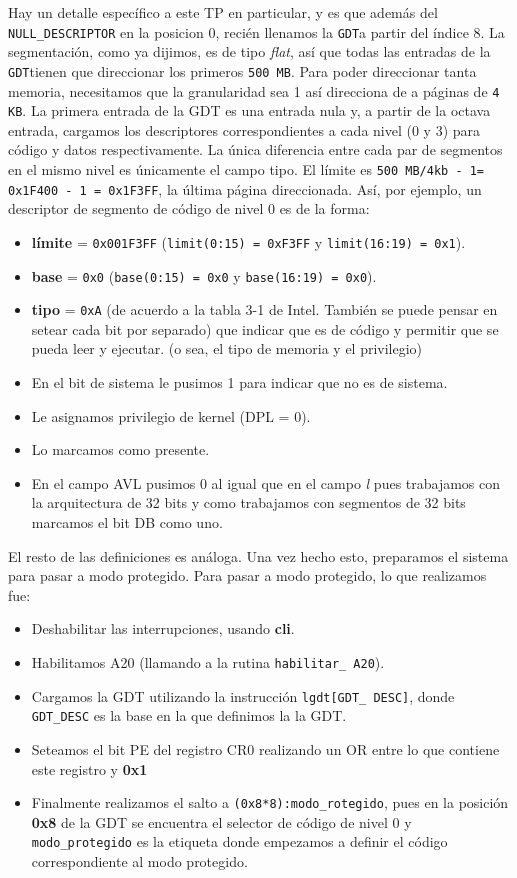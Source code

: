 \documentclass[twocolumn,10pt]{article}
\newcommand{\GDT}{\texttt{GDT}}
\begin{document}
Hay un detalle específico a este TP en particular, y es que además del
\texttt{NULL\_DESCRIPTOR} en la posicion 0, recién llenamos la \GDT a
partir del índice 8. La segmentación, como ya dijimos, es de tipo
\emph{flat}, así que todas las entradas de la \GDT tienen que
direccionar los primeros \texttt{500 MB}. Para poder direccionar tanta
memoria, necesitamos que la granularidad sea 1 así direcciona de a
páginas de \texttt{4 KB}. La primera entrada de la GDT es una entrada
nula y, a partir de la octava entrada, cargamos los descriptores
correspondientes a cada nivel (0 y 3) para código y datos
respectivamente. La única diferencia entre cada par de segmentos en el
mismo nivel es únicamente el campo tipo. El límite es \texttt{500
  MB/4kb - 1= 0x1F400 - 1 = 0x1F3FF}, la última página
direccionada. Así, por ejemplo, un descriptor de segmento de código de
nivel 0 es de la forma:
\begin{itemize}
\item \textbf{límite} = \texttt{0x001F3FF} (\texttt{limit(0:15) =
    0xF3FF} y \texttt{limit(16:19) = 0x1}).
\item \textbf{base} = \texttt{0x0} (\texttt{base(0:15) = 0x0} y
  \texttt{base(16:19) = 0x0}).
\item \textbf{tipo} = \texttt{0xA} (de acuerdo a la tabla 3-1 de
  Intel. También se puede pensar en setear cada bit por separado) que
  indicar que es de código y permitir que se pueda leer y ejecutar. (o
  sea, el tipo de memoria y el privilegio)
\item En el bit de sistema le pusimos 1 para indicar que no es
  de sistema.
\item Le asignamos privilegio de kernel (DPL = 0).
\item Lo marcamos como presente.
\item En el campo AVL pusimos 0 al igual que en el campo \textit{l}
  pues trabajamos con la arquitectura de 32 bits y como trabajamos con
  segmentos de 32 bits marcamos el bit DB como uno.  
\end{itemize}


El resto de las definiciones es análoga. Una vez hecho esto,
preparamos el sistema para pasar a modo protegido. Para pasar a modo
protegido, lo que realizamos fue:
\begin{itemize}
\item Deshabilitar las interrupciones, usando \textbf{cli}.
\item Habilitamos A20 (llamando a la rutina \texttt{habilitar\_ A20}).
\item Cargamos la GDT utilizando la instrucción
  \texttt{lgdt[GDT\_ DESC]}, donde \texttt{GDT\_DESC} es la base en la
  que definimos la la GDT.
\item Seteamos el bit PE del registro CR0 realizando un OR
  entre lo que contiene este registro y \textbf{0x1}
\item Finalmente realizamos el salto a
  \texttt{(0x8*8):modo\_rotegido}, pues en la posición \textbf{0x8} de
  la GDT se encuentra el selector de código de nivel 0 y
  \texttt{modo\_protegido} es la etiqueta donde empezamos a definir el
  código correspondiente al modo protegido.
\end{itemize} 
\end{document}

